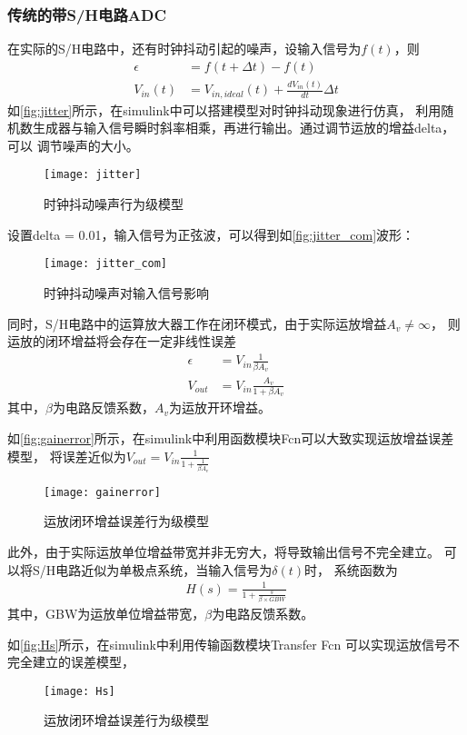     \subsubsection{传统的带S/H电路ADC}
    在实际的S/H电路中，还有时钟抖动引起的噪声，设输入信号为$ f(t) $，则
    \begin{align}
        \epsilon & = f(t+\Delta t)-f(t) \\
        V_{in}(t) & = V_{in,ideal}(t) + \frac{dV_{in}(t)}{dt}\Delta t 
    \end{align}
    如\autoref{fig:jitter}所示，在simulink中可以搭建模型对时钟抖动现象进行仿真，
    利用随机数生成器与输入信号瞬时斜率相乘，再进行输出。通过调节运放的增益delta，可以
    调节噪声的大小。
    \begin{figure}[H]
        \centering
        \texttt{[image: jitter]}
        \caption{\label{fig:jitter}时钟抖动噪声行为级模型}
    \end{figure}
    \par 设置delta = 0.01，输入信号为正弦波，可以得到如\autoref{fig:jitter_com}波形：
    \begin{figure}[H]
        \centering
        \texttt{[image: jitter\_com]}
        \caption{\label{fig:jitter_com}时钟抖动噪声对输入信号影响}
    \end{figure}
    \par 同时，S/H电路中的运算放大器工作在闭环模式，由于实际运放增益$ A_v \neq \infty $，
    则运放的闭环增益将会存在一定非线性误差
    \begin{align}
        \epsilon & = V_{in}\frac{1}{\beta A_v} \\
        V_{out} & = V_{in}\frac{A_v}{1+\beta A_v}
    \end{align}
    其中，$ \beta $为电路反馈系数，$ A_v $为运放开环增益。
    \par 如\autoref{fig:gainerror}所示，在simulink中利用函数模块Fcn可以大致实现运放增益误差模型，
    将误差近似为$ V_{out} = V_{in}\frac{1}{1+\frac{1}{\beta A_v}} $
    \begin{figure}[H]
        \centering
        \texttt{[image: gainerror]}
        \caption{\label{fig:gainerror}运放闭环增益误差行为级模型}
    \end{figure}

    \par 此外，由于实际运放单位增益带宽并非无穷大，将导致输出信号不完全建立。
    可以将S/H电路近似为单极点系统，当输入信号为$ \delta(t) $时，
    系统函数为
    \begin{align}
        H(s) = \frac{1}{1+\frac{s}{\beta\times GBW}}
    \end{align}
    其中，GBW为运放单位增益带宽，$ \beta $为电路反馈系数。
    \par 如\autoref{fig:Hs}所示，在simulink中利用传输函数模块Transfer Fcn
    可以实现运放信号不完全建立的误差模型，
    \begin{figure}[H]
        \centering
        \texttt{[image: Hs]}
        \caption{\label{fig:Hs}运放闭环增益误差行为级模型}
    \end{figure}



